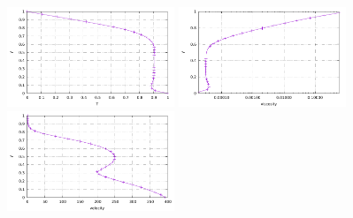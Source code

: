 \begin{center}
\includegraphics[width=5cm]{python_codes/fieldstone_28/results_case1/T_profile.pdf}
\includegraphics[width=5cm]{python_codes/fieldstone_28/results_case1/eta_profile.pdf}
\includegraphics[width=5cm]{python_codes/fieldstone_28/results_case1/V_profile.pdf}
\end{center}

